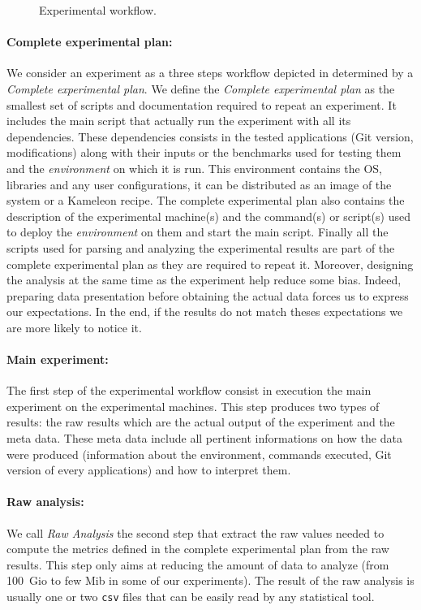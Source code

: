 \begin{figure}[htb]
    \centering
    
    \caption{Experimental workflow.}
    \label{fig:exp-pipeline}
\end{figure}

\paragraph{Complete experimental plan:}
We consider an experiment as a three steps workflow depicted in  determined by a \emph{Complete experimental plan}.
We define the \emph{Complete experimental plan} as the smallest set of scripts and documentation required to repeat an experiment.
It includes the main script that actually run the experiment with all its dependencies.
These dependencies consists in the tested applications (\gls{Git} version, modifications) along with their inputs or the benchmarks used for testing them and the \emph{environment} on which it is run.
This environment contains the \gls{OS}, libraries and any user configurations, it can be distributed as an image of the system or a \gls{Kameleon} recipe.
The complete experimental plan also contains the description of the experimental machine(s) and the command(s) or script(s) used to deploy the \emph{environment} on them and start the main script.
Finally all the scripts used for parsing and analyzing the experimental results are part of the complete experimental plan as they are required to repeat it.
Moreover, designing the analysis at the same time as the experiment help reduce some bias.
Indeed, preparing data presentation before obtaining the actual data forces us to express our expectations.
In the end, if the results do not match theses expectations we are more likely to notice it.

\paragraph{Main experiment:}
The first step of the experimental workflow consist in execution the main experiment on the experimental machines.
This step produces two types of results: the raw results which are the actual output of the experiment and the meta data.
These meta data include all pertinent informations on how the data were produced (information about the environment, commands executed, \gls{Git} version of every applications) and how to interpret them.

\paragraph{Raw analysis:}
We call \emph{Raw Analysis} the second step that extract the raw values needed to compute the metrics defined in the complete experimental plan from the raw results.
This step only aims at reducing the amount of data to analyze (from \SI{100}{Gio} to few Mib in some of our experiments).
The result of the raw analysis is usually one or two \texttt{csv} files that can be easily read by any statistical tool.

